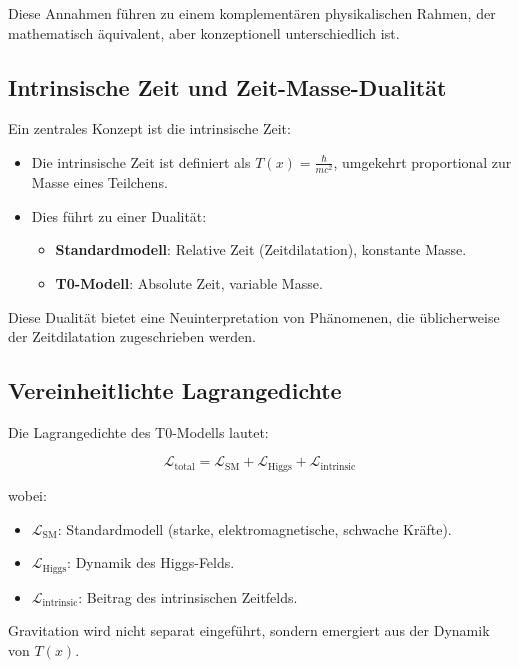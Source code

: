 \documentclass[a4paper,12pt]{article}
\theoremstyle{definition}
\theoremstyle{remark}
\newcommand{\Tfield}{T(x)}
\begin{document}
	Diese Annahmen führen zu einem komplementären physikalischen Rahmen, der mathematisch äquivalent, aber konzeptionell unterschiedlich ist.
	
	\subsection{Intrinsische Zeit und Zeit-Masse-Dualität}
	
	Ein zentrales Konzept ist die intrinsische Zeit:
	
	\begin{itemize}
		\item Die intrinsische Zeit ist definiert als $\Tfield = \frac{\hbar}{mc^2}$, umgekehrt proportional zur Masse eines Teilchens.
		\item Dies führt zu einer Dualität:
		\begin{itemize}
			\item \textbf{Standardmodell}: Relative Zeit (Zeitdilatation), konstante Masse.
			\item \textbf{T0-Modell}: Absolute Zeit, variable Masse.
		\end{itemize}
	\end{itemize}
	
	Diese Dualität bietet eine Neuinterpretation von Phänomenen, die üblicherweise der Zeitdilatation zugeschrieben werden.
	
	\subsection{Vereinheitlichte Lagrangedichte}
	
	Die Lagrangedichte des T0-Modells lautet:
	
	\begin{equation}
		\mathcal{L}_\text{total} = \mathcal{L}_\text{SM} + \mathcal{L}_\text{Higgs} + \mathcal{L}_\text{intrinsic}
	\end{equation}
	
	wobei:
	\begin{itemize}
		\item \(\mathcal{L}_\text{SM}\): Standardmodell (starke, elektromagnetische, schwache Kräfte).
		\item \(\mathcal{L}_\text{Higgs}\): Dynamik des Higgs-Felds.
		\item \(\mathcal{L}_\text{intrinsic}\): Beitrag des intrinsischen Zeitfelds.
	\end{itemize}
	
	Gravitation wird nicht separat eingeführt, sondern emergiert aus der Dynamik von \(\Tfield\).
	
\end{document}
